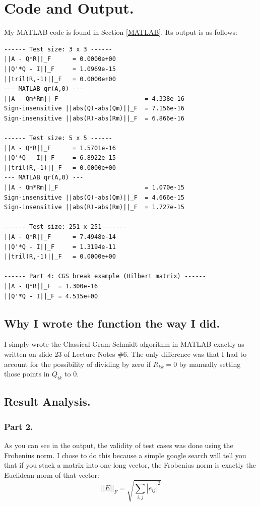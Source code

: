\documentclass{article}
\begin{document}
\section{Code and Output.}
My MATLAB code is found in Section \ref{MATLAB}. Its output is as follows:
\begin{verbatim}
------ Test size: 3 x 3 ------
||A - Q*R||_F      = 0.0000e+00
||Q'*Q - I||_F     = 1.0969e-15
||tril(R,-1)||_F   = 0.0000e+00
--- MATLAB qr(A,0) ---
||A - Qm*Rm||_F                        = 4.338e-16
Sign-insensitive ||abs(Q)-abs(Qm)||_F  = 7.156e-16
Sign-insensitive ||abs(R)-abs(Rm)||_F  = 6.866e-16

------ Test size: 5 x 5 ------
||A - Q*R||_F      = 1.5701e-16
||Q'*Q - I||_F     = 6.8922e-15
||tril(R,-1)||_F   = 0.0000e+00
--- MATLAB qr(A,0) ---
||A - Qm*Rm||_F                        = 1.070e-15
Sign-insensitive ||abs(Q)-abs(Qm)||_F  = 4.666e-15
Sign-insensitive ||abs(R)-abs(Rm)||_F  = 1.727e-15

------ Test size: 251 x 251 ------
||A - Q*R||_F      = 7.4948e-14
||Q'*Q - I||_F     = 1.3194e-11
||tril(R,-1)||_F   = 0.0000e+00

------ Part 4: CGS break example (Hilbert matrix) ------
||A - Q*R||_F  = 1.300e-16
||Q'*Q - I||_F = 4.515e+00
\end{verbatim}

\subsection{Why I wrote the function the way I did.}
I simply wrote the Classical Gram-Schmidt algorithm in MATLAB exactly as written on slide 23 of Lecture Notes \#6.
The only difference was that I had to account for the possibility of dividing by zero if $R_{kk} = 0$ by manually setting those points in $Q_{ik}$ to $0$.

\subsection{Result Analysis.}
\subsubsection{Part 2.}
As you can see in the output, the validity of test cases was done using the Frobenius norm. I chose to do this because a simple google search will tell you that if you stack a matrix into one long vector, the Frobenius norm is exactly the Euclidean norm of that vector:
\[||E||_F=\sqrt{\sum_{i,j}|e_{ij}|^2}\]
\end{document}
